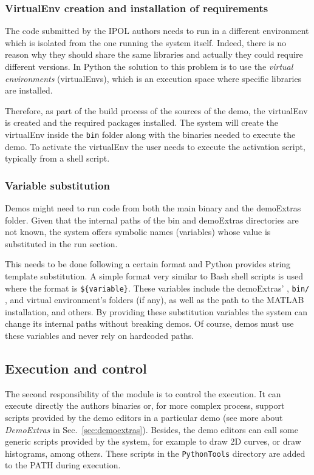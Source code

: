 \subsubsection{VirtualEnv creation and installation of requirements}
\noindent

The code submitted by the IPOL authors needs to run in a different environment which is isolated from the one running the system itself. Indeed, there is no reason why they should share the same libraries and actually they could require different versions. In Python the solution to this problem is to use the \emph{virtual environments} (virtualEnvs), which is an execution space where specific libraries are installed.

Therefore, as part of the build process of the sources of the demo, the virtualEnv is created and the required packages installed.
%
The system will create the virtualEnv inside the {\tt bin} folder along with the binaries needed to execute the demo. To activate the virtualEnv the user needs to execute the activation script, typically from a shell script.


\subsubsection{Variable substitution}
Demos might need to run code from both the main binary and the demoExtras folder. Given that the internal paths of the bin and demoExtras directories are not known, the system offers symbolic names (variables) whose value is substituted in the run section.

This needs to be done following a certain format and Python provides string template substitution. A simple format very similar to Bash shell scripts is used where the format is {\tt \$\{variable\}}. These variables include the demoExtras' , {\tt bin/} , and virtual environment's folders (if any), as well as the path to the MATLAB installation, and others. By providing these substitution variables the system can change its internal paths without breaking demos. Of course, demos must use these variables and never rely on hardcoded paths.


\subsection{Execution and control}
\noindent

The second responsibility of the module is to control the execution.  It can execute directly the authors binaries or, for more complex process, support scripts provided by the demo editors in a particular demo (see more about \textit{DemoExtras} in Sec.~\ref{sec:demoextras}). Besides, the demo editors can call some generic scripts provided by the system, for example to draw 2D curves, or draw histograms, among others. These scripts in the {\tt PythonTools} directory are added to the PATH during execution.

